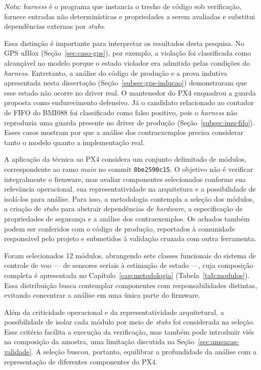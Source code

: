 \noindent
\footnotesize
\textit{Nota:} \textit{harness} é o programa que instancia o trecho de código sob verificação, fornece entradas não determinísticas e propriedades a serem avaliadas e substitui dependências externas por \textit{stubs}.
\normalsize

Essa distinção é importante para interpretar os resultados desta pesquisa. No GPS uBlox (Seção~\ref{sec:caso-gps}), por exemplo, a violação foi classificada como alcançável no modelo porque o estado violador era admitido pelas condições do \textit{harness}. Entretanto, a análise do código de produção e a prova indutiva apresentada nesta dissertação (Seção~\ref{subsec:gps-inducao}) demonstraram que esse estado não ocorre no driver real. O mantenedor do PX4 enquadrou a guarda proposta como endurecimento defensivo. Já o candidato relacionado ao contador de FIFO do BMI088 foi classificado como falso positivo, pois o \textit{harness} não reproduzia uma guarda presente no driver de produção (Seção~\ref{subsec:imu-fifo}). Esses casos mostram por que a análise dos contraexemplos precisa considerar tanto o modelo quanto a implementação real.

A aplicação da técnica ao PX4 considera um conjunto delimitado de módulos, correspondente ao ramo \textit{main} no commit \texttt{8be2590c15}. O objetivo não é verificar integralmente o firmware, mas avaliar componentes selecionados conforme sua relevância operacional, sua representatividade na arquitetura e a possibilidade de isolá-los para análise. Para isso, a metodologia contempla a seleção dos módulos, a criação de \textit{stubs} para abstrair dependências de \textit{hardware}, a especificação de propriedades de segurança e a análise dos contraexemplos. Os achados também podem ser conferidos com o código de produção, reportados à comunidade responsável pelo projeto e submetidos à validação cruzada com outra ferramenta.

Foram selecionados 12 módulos, abrangendo sete classes funcionais do sistema de controle de voo --- de sensores seriais à estimação de estado ---, cuja composição completa é apresentada no Capítulo~\ref{cap:metodologia} (Tabela~\ref{tab:modulos}). Essa distribuição busca contemplar componentes com responsabilidades distintas, evitando concentrar a análise em uma única parte do firmware.

Além da criticidade operacional e da representatividade arquitetural, a possibilidade de isolar cada módulo por meio de \textit{stubs} foi considerada na seleção. Esse critério facilita a execução da verificação, mas também pode introduzir viés na composição da amostra, uma limitação discutida na Seção~\ref{sec:ameacas-validade}. A seleção buscou, portanto, equilibrar a profundidade da análise com a representação de diferentes componentes do PX4.

